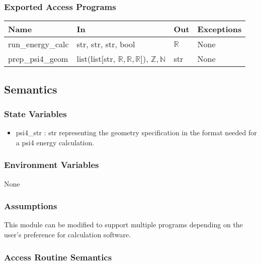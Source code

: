 \documentclass[12pt, titlepage]{article}
\begin{document}
\subsubsection{Exported Access Programs}

\begin{center}
	\begin{tabular}{p{2cm} p{4cm} p{4cm} p{2cm}}
		\hline
		\textbf{Name} & \textbf{In} & \textbf{Out} & \textbf{Exceptions} \\
		\hline
		run\_energy\_calc & str, str, str, bool & $\mathbb{R}$ & None \\
		prep\_psi4\_geom & list(list[str, $\mathbb{R}, \mathbb{R}, 
		\mathbb{R}$]), $\mathbb{Z}, \mathbb{N}$ & str & None \\
		\hline
	\end{tabular}
\end{center}

\subsection{Semantics}

\subsubsection{State Variables}

\begin{itemize}
	\item psi4\_str : str representing the geometry specification in the format 
	needed for a psi4 energy calculation.
\end{itemize}


\subsubsection{Environment Variables}

None

\subsubsection{Assumptions}

This module can be modified to support multiple programs depending on the 
user's preference for calculation software.

\subsubsection{Access Routine Semantics}
\end{document}
